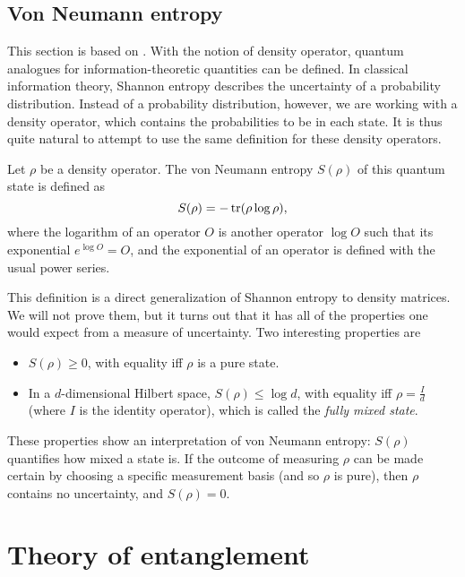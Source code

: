 \subsection{Von Neumann entropy}

This section is based on \cite[pp. 510--527]{nielsen_quantum_2010}. With the notion of density operator, quantum analogues for information-theoretic quantities can be defined. In classical information theory, Shannon entropy describes the uncertainty of a probability distribution. Instead of a probability distribution, however, we are working with a density operator, which contains the probabilities to be in each state. It is thus quite natural to attempt to use the same definition for these density operators.

\begin{definition}
    Let $\rho$ be a density operator. The von Neumann entropy $S(\rho)$ of this quantum state is defined as
    \begin{equation}
        S(\rho) = - \operatorname{tr}(\rho \log \rho),
    \end{equation}
    where the logarithm of an operator $O$ is another operator $\log O$ such that its exponential $e^{\log O} = O$, and the exponential of an operator is defined with the usual power series.
\end{definition}

This definition is a direct generalization of Shannon entropy to density matrices. We will not prove them, but it turns out that it has all of the properties one would expect from a measure of uncertainty. Two interesting properties are

\begin{itemize}
    \item $S(\rho) \geq 0$, with equality iff $\rho$ is a pure state.
    \item In a $d$-dimensional Hilbert space, $S(\rho) \leq \log d$, with equality iff $\rho = \frac{I}{d}$ (where $I$ is the identity operator), which is called the \textit{fully mixed state}.
\end{itemize}

These properties show an interpretation of von Neumann entropy: $S(\rho)$ quantifies how mixed a state is. If the outcome of measuring $\rho$ can be made certain by choosing a specific measurement basis (and so $\rho$ is pure), then $\rho$ contains no uncertainty, and $S(\rho) = 0$.



\section{Theory of entanglement} \label{sec:entanglement}

